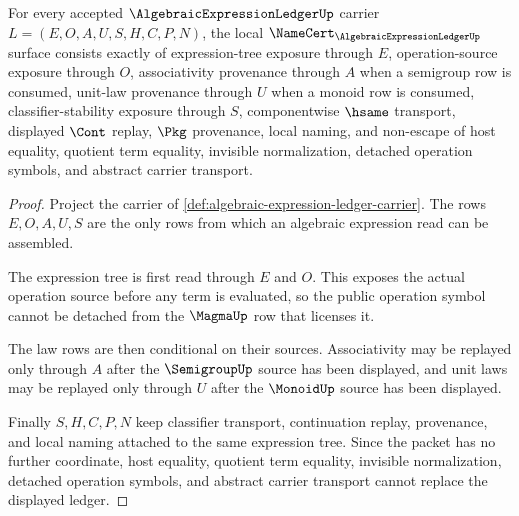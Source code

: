 \begin{theorem}
\label{thm:algebraic-expression-ledger-namecert-obligations}
For every accepted $\AlgebraicExpressionLedgerUp$ carrier $L=(E,O,A,U,S,H,C,P,N)$, the local $\NameCert_{\AlgebraicExpressionLedgerUp}$ surface consists exactly of expression-tree exposure through $E$, operation-source exposure through $O$, associativity provenance through $A$ when a semigroup row is consumed, unit-law provenance through $U$ when a monoid row is consumed, classifier-stability exposure through $S$, componentwise $\hsame$ transport, displayed $\Cont$ replay, $\Pkg$ provenance, local naming, and non-escape of host equality, quotient term equality, invisible normalization, detached operation symbols, and abstract carrier transport.
\end{theorem}
\begin{proof}
Project the carrier of \autoref{def:algebraic-expression-ledger-carrier}. The rows $E,O,A,U,S$ are the only rows from which an algebraic expression read can be assembled.

The expression tree is first read through $E$ and $O$. This exposes the actual operation source before any term is evaluated, so the public operation symbol cannot be detached from the $\MagmaUp$ row that licenses it.

The law rows are then conditional on their sources. Associativity may be replayed only through $A$ after the $\SemigroupUp$ source has been displayed, and unit laws may be replayed only through $U$ after the $\MonoidUp$ source has been displayed.

Finally $S,H,C,P,N$ keep classifier transport, continuation replay, provenance, and local naming attached to the same expression tree. Since the packet has no further coordinate, host equality, quotient term equality, invisible normalization, detached operation symbols, and abstract carrier transport cannot replace the displayed ledger.
\end{proof}

